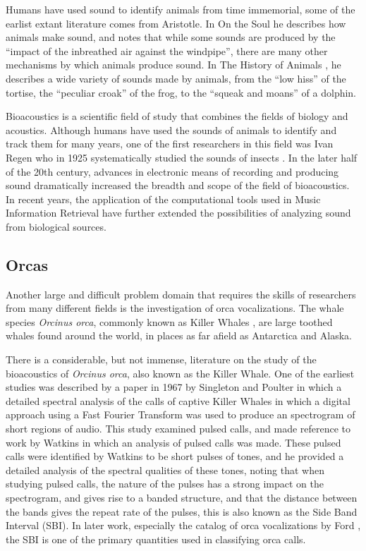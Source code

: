 \documentclass[12pt,oneside]{book}
\begin{document}
Humans have used sound to identify animals from time immemorial, some
of the earlist extant literature comes from Aristotle.  In On the Soul
\cite{aristotleA} he describes how animals make sound, and notes that
while some sounds are produced by the ``impact of the inbreathed air
against the windpipe'', there are many other mechanisms by which
animals produce sound.  In The History of Animals \cite{aristotleB},
he describes a wide variety of sounds made by animals, from the ``low
hiss'' of the tortise, the ``peculiar croak'' of the frog, to the
``squeak and moans'' of a dolphin.

Bioacoustics is a scientific field of study that combines the fields
of biology and acoustics.  Although humans have used the sounds of
animals to identify and track them for many years, one of the first
researchers in this field was Ivan Regen who in 1925 systematically
studied the sounds of insects \cite{zarnik29}.  In the later half of
the 20th century, advances in electronic means of recording and
producing sound dramatically increased the breadth and scope of the
field of bioacoustics.  In recent years, the application of the
computational tools used in Music Information Retrieval have further
extended the possibilities of analyzing sound from biological sources.

\subsection{Orcas}

Another large and difficult problem domain that requires the skills of
researchers from many different fields is the investigation of orca
vocalizations.  The whale species \emph{Orcinus orca}, commonly known
as Killer Whales \cite{ford00_book_killer_whales}, are large toothed
whales found around the world, in places as far afield as Antarctica
and Alaska\cite{estes09_orca_alaska_decline}.

There is a considerable, but not immense, literature on the study of
the bioacoustics of \textit{Orcinus orca}, also known as the Killer
Whale.  One of the earliest studies was described by a paper in 1967
by Singleton and Poulter \cite{singleton67} in which a detailed
spectral analysis of the calls of captive Killer Whales in which a
digital approach using a Fast Fourier Transform was used to produce an
spectrogram of short regions of audio.  This study examined pulsed
calls, and made reference to work by Watkins \cite{watkins67} in which
an analysis of pulsed calls was made.  These pulsed calls were
identified by Watkins to be short pulses of tones, and he provided a
detailed analysis of the spectral qualities of these tones, noting
that when studying pulsed calls, the nature of the pulses has a strong
impact on the spectrogram, and gives rise to a banded structure, and
that the distance between the bands gives the repeat rate of the
pulses, this is also known as the Side Band Interval (SBI).  In later
work, especially the catalog of orca vocalizations by Ford
\cite{ford87}, the SBI is one of the primary quantities used in
classifying orca calls.  
\end{document}
